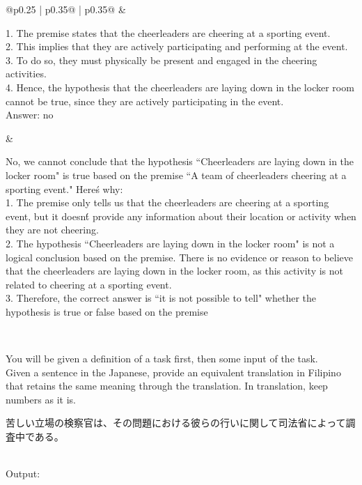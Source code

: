 \begin{table}[!ht]
\begin{tabular}{@{}p{0.25\textwidth} | p{0.35\textwidth}@{} | p{0.35\textwidth}@{}}
 & 
\begin{minipage}[t]{\linewidth}%
\raggedright
{\footnotesize 
1. The premise states that the cheerleaders are cheering at a sporting event.\\2. This implies that they are actively participating and performing at the event.\\3. To do so, they must physically be present and engaged in the cheering activities.\\4. Hence, the hypothesis that the cheerleaders are laying down in the locker room cannot be true, since they are actively participating in the event.\\Answer: no
}
\end{minipage}
& 
\begin{minipage}[t]{\linewidth}%
\raggedright
{\footnotesize  No, we cannot conclude that the hypothesis ``Cheerleaders are laying down in the locker room" is true based on the premise ``A team of cheerleaders cheering at a sporting event." Here\'s why:\\1. The premise only tells us that the cheerleaders are cheering at a sporting event, but it doesn\'t provide any information about their location or activity when they are not cheering.\\2. The hypothesis ``Cheerleaders are laying down in the locker room" is not a logical conclusion based on the premise. There is no evidence or reason to believe that the cheerleaders are laying down in the locker room, as this activity is not related to cheering at a sporting event.\\3. Therefore, the correct answer is ``it is not possible to tell" whether the hypothesis is true or false based on the premise}
\end{minipage} \\

\midrule

\begin{minipage}[t]{\linewidth}%
\raggedright
{\footnotesize 
You will be given a definition of a task first, then some input of the task.\\Given a sentence in the Japanese, provide an equivalent translation in Filipino that retains the same meaning through the translation. In translation, keep numbers as it is.\\\begin{CJK}{UTF8}{min}
苦しい立場の検察官は、その問題における彼らの行いに関して司法省によって調査中である。\end{CJK}\\Output:
}
\end{minipage}
 

\end{tabular}
\end{table}
